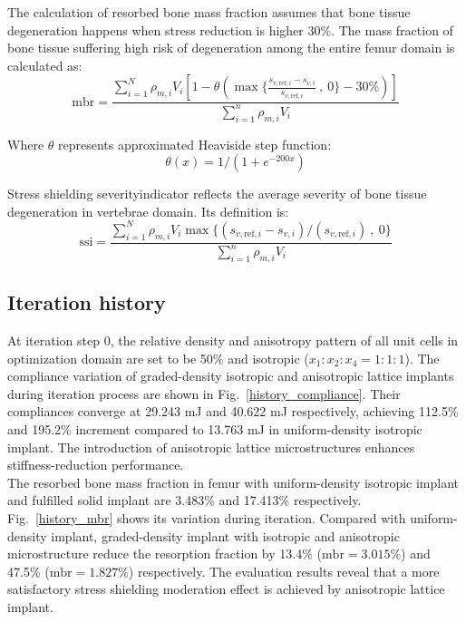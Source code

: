 \documentclass[12pt]{extbook}
\begin{document}
The calculation of resorbed bone mass fraction assumes that bone tissue degeneration happens when stress reduction is higher 30\%. The mass fraction of bone tissue suffering high risk of degeneration among the entire femur domain is calculated as:
\begin{equation}
\text{mbr} = \frac{\sum_{i=1}^N \rho_{m,i}V_i [1- \theta(\max\{\frac{s_{v, \text{ref}, i} - s_{v,i}}{s_{v,\text{ref},i}}~,~0\}-30\%)]}{\sum_{i=1}^n \rho_{m,i}V_i}
\label{5-2-1}
\end{equation}

Where $\theta$ represents approximated Heaviside step function:
\begin{equation}
\theta(x) = 1 / (1 + e^{-200x})
\label{5-2-T1}
\end{equation}

Stress shielding severityindicator reflects the average severity of bone tissue degeneration in vertebrae domain. Its definition is:
\begin{equation}
\text{ssi} = \frac{\sum_{i=1}^N \rho_{m,i}V_i \max\{(s_{v, \text{ref}, i} - s_{v,i}) / (s_{v,\text{ref},i})~,~0\}}{\sum_{i=1}^n \rho_{m,i}V_i}
\label{4-5-T1}
\end{equation}


\subsection{Iteration history}

At iteration step 0, the relative density and anisotropy pattern of all unit cells in optimization domain are set to be 50\% and isotropic ($x_1:x_2:x_4 = 1:1:1$). The compliance variation of graded-density isotropic and anisotropic lattice implants during iteration process are shown in Fig.~\ref{history_compliance}. Their compliances converge at 29.243 mJ and 40.622 mJ respectively, achieving 112.5\% and 195.2\% increment compared to 13.763 mJ in uniform-density isotropic implant. The introduction of anisotropic lattice microstructures enhances stiffness-reduction performance.\\

The resorbed bone mass fraction in femur with uniform-density isotropic implant and fulfilled solid implant are 3.483\% and 17.413\% respectively. Fig.~\ref{history_mbr} shows its variation during iteration. Compared with uniform-density implant, graded-density implant with isotropic and anisotropic microstructure reduce the resorption fraction by 13.4\% ($\text{mbr} = 3.015\%$) and 47.5\% ($\text{mbr} = 1.827\%$) respectively. The evaluation results reveal that a more satisfactory stress shielding moderation effect is achieved by anisotropic lattice implant.\\
\end{document}
